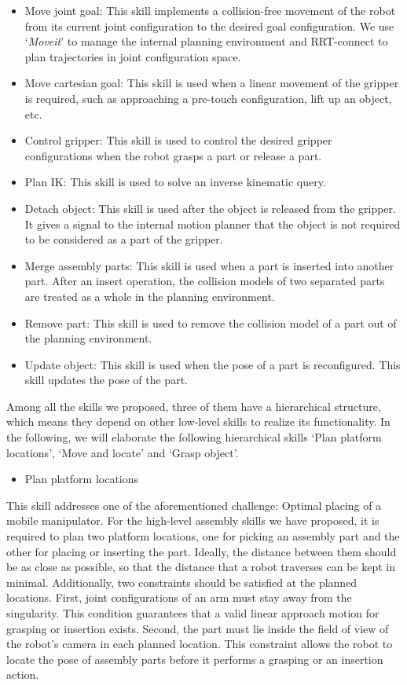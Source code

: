 \begin{itemize}
\item  Move joint goal: This skill implements a collision-free movement of the robot from its current joint configuration to the desired goal configuration. We use `\textit{Moveit}' to manage the internal planning environment and RRT-connect to plan trajectories in joint configuration space. 
\item  Move cartesian goal: This skill is used when a linear movement of the gripper is required, such as approaching a pre-touch configuration, lift up an object, etc.   
\item  Control gripper: This skill is used to control the desired gripper configurations when the robot grasps a part or release a part. 
\item Plan IK: This skill is used to solve an inverse kinematic query.
\item Detach object: This skill is used after the object is released from the gripper. It gives a signal to the internal motion planner that the object is not required to be considered as a part of the gripper. 
\item Merge assembly parts: This skill is used when a part is inserted into another part. After an insert operation, the collision models of two separated parts are treated as a whole in the planning environment. 
\item Remove part: This skill is used to remove the collision model of a part out of the planning environment. 
\item Update object: This skill is used when the pose of a part is reconfigured. This skill updates the pose of the part. 
\end{itemize}
 Among all the skills we proposed, three of them have a hierarchical structure, which means they depend on other low-level skills to realize its functionality. In the following, we will elaborate the following hierarchical skills `Plan platform locations', `Move and locate' and `Grasp object'.
\begin{itemize}
\item Plan platform locations 
\end{itemize}
This skill addresses one of the aforementioned challenge: Optimal placing of a mobile manipulator. For the high-level assembly skills we have proposed, it is required to plan two platform locations, one for picking an assembly part and the other for placing or inserting the part. Ideally, the distance between them should be as close as possible, so that the distance that a robot traverses can be kept in minimal. Additionally, two constraints should be satisfied at the planned locations. First, joint configurations of an arm must stay away from the singularity. This condition guarantees that a valid linear approach motion for grasping or insertion exists. Second, the part must lie inside the field of view of the robot's camera in each planned location. This constraint allows the robot to locate the pose of assembly parts before it performs a grasping or an insertion action. 

